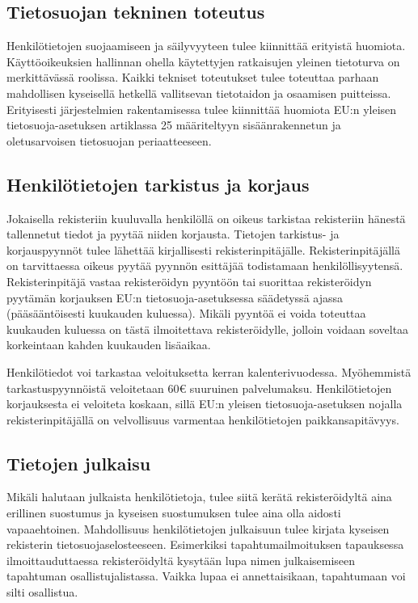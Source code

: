 \documentclass[finnish]{tktltiki}
\begin{document}
\subsection*{Tietosuojan tekninen toteutus}

Henkilötietojen suojaamiseen ja säilyvyyteen tulee kiinnittää erityistä huomiota. Käyttöoikeuksien hallinnan ohella käytettyjen ratkaisujen yleinen tietoturva on merkittävässä roolissa. Kaikki tekniset toteutukset tulee toteuttaa parhaan mahdollisen kyseisellä hetkellä vallitsevan tietotaidon ja osaamisen puitteissa. Erityisesti järjestelmien rakentamisessa tulee kiinnittää huomiota EU:n yleisen tietosuoja-asetuksen artiklassa 25 määriteltyyn sisäänrakennetun ja oletusarvoisen tietosuojan periaatteeseen.


\subsection*{Henkilötietojen tarkistus ja korjaus}

Jokaisella rekisteriin kuuluvalla henkilöllä on oikeus tarkistaa rekisteriin hänestä tallennetut tiedot ja pyytää niiden korjausta. Tietojen tarkistus- ja korjauspyynnöt tulee lähettää kirjallisesti rekisterinpitäjälle. Rekisterinpitäjällä on tarvittaessa oikeus pyytää pyynnön esittäjää todistamaan henkilöllisyytensä. Rekisterinpitäjä vastaa rekisteröidyn pyyntöön tai suorittaa rekisteröidyn pyytämän korjauksen EU:n tietosuoja-asetuksessa säädetyssä ajassa (pääsääntöisesti kuukauden kuluessa). Mikäli pyyntöä ei voida toteuttaa kuukauden kuluessa on tästä ilmoitettava rekisteröidylle, jolloin voidaan soveltaa korkeintaan kahden kuukauden lisäaikaa.

Henkilötiedot voi tarkastaa veloituksetta kerran kalenterivuodessa. Myöhemmistä tarkastuspyynnöistä veloitetaan 60€ suuruinen palvelumaksu. Henkilötietojen korjauksesta ei veloiteta koskaan, sillä EU:n yleisen tietosuoja-asetuksen nojalla rekisterinpitäjällä on velvollisuus varmentaa henkilötietojen paikkansapitävyys.


\subsection*{Tietojen julkaisu}

Mikäli halutaan julkaista henkilötietoja, tulee siitä kerätä rekisteröidyltä aina erillinen suostumus ja kyseisen suostumuksen tulee aina olla aidosti vapaaehtoinen. Mahdollisuus henkilötietojen julkaisuun tulee kirjata kyseisen rekisterin tietosuojaselosteeseen. Esimerkiksi tapahtumailmoituksen tapauksessa ilmoittauduttaessa rekisteröidyltä kysytään lupa nimen julkaisemiseen tapahtuman osallistujalistassa. Vaikka lupaa ei annettaisikaan, tapahtumaan voi silti osallistua.
\end{document}

